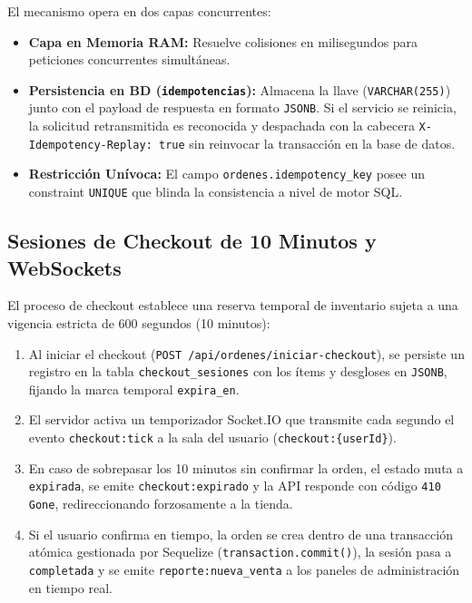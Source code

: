 \documentclass[conference]{IEEEtran}
\begin{document}
El mecanismo opera en dos capas concurrentes:
\begin{itemize}
    \item \textbf{Capa en Memoria RAM:} Resuelve colisiones en milisegundos para peticiones concurrentes simultáneas.
    \item \textbf{Persistencia en BD (\texttt{idempotencias}):} Almacena la llave (\texttt{VARCHAR(255)}) junto con el payload de respuesta en formato \texttt{JSONB}. Si el servicio se reinicia, la solicitud retransmitida es reconocida y despachada con la cabecera \texttt{X-Idempotency-Replay: true} sin reinvocar la transacción en la base de datos.
    \item \textbf{Restricción Unívoca:} El campo \texttt{ordenes.idempotency\_key} posee un constraint \texttt{UNIQUE} que blinda la consistencia a nivel de motor SQL.
\end{itemize}

\subsection{Sesiones de Checkout de 10 Minutos y WebSockets}
El proceso de checkout establece una reserva temporal de inventario sujeta a una vigencia estricta de 600 segundos (10 minutos):
\begin{enumerate}
    \item Al iniciar el checkout (\texttt{POST /api/ordenes/iniciar-checkout}), se persiste un registro en la tabla \texttt{checkout\_sesiones} con los ítems y desgloses en \texttt{JSONB}, fijando la marca temporal \texttt{expira\_en}.
    \item El servidor activa un temporizador Socket.IO que transmite cada segundo el evento \texttt{checkout:tick} a la sala del usuario (\texttt{checkout:\{userId\}}).
    \item En caso de sobrepasar los 10 minutos sin confirmar la orden, el estado muta a \texttt{expirada}, se emite \texttt{checkout:expirado} y la API responde con código \texttt{410 Gone}, redireccionando forzosamente a la tienda.
    \item Si el usuario confirma en tiempo, la orden se crea dentro de una transacción atómica gestionada por Sequelize (\texttt{transaction.commit()}), la sesión pasa a \texttt{completada} y se emite \texttt{reporte:nueva\_venta} a los paneles de administración en tiempo real.
\end{enumerate}

\end{document}
